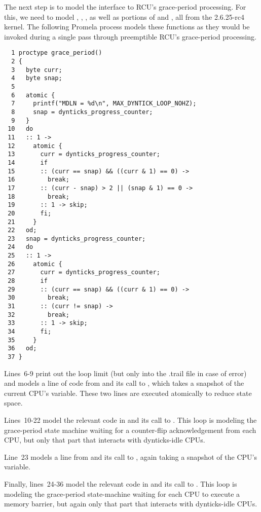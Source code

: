The next step is to model the interface to RCU's grace-period
processing.
For this, we need to model
,
,
,
as well as portions of
 and
, all from the 2.6.25-rc4 kernel.
The following  Promela process models
these functions as they would be invoked during a single pass
through preemptible RCU's grace-period processing.

{ \scriptsize
\begin{verbatim}
  1 proctype grace_period()
  2 {
  3   byte curr;
  4   byte snap;
  5
  6   atomic {
  7     printf("MDLN = %d\n", MAX_DYNTICK_LOOP_NOHZ);
  8     snap = dynticks_progress_counter;
  9   }
 10   do
 11   :: 1 ->
 12     atomic {
 13       curr = dynticks_progress_counter;
 14       if
 15       :: (curr == snap) && ((curr & 1) == 0) ->
 16         break;
 17       :: (curr - snap) > 2 || (snap & 1) == 0 ->
 18         break;
 19       :: 1 -> skip;
 20       fi;
 21     }
 22   od;
 23   snap = dynticks_progress_counter;
 24   do
 25   :: 1 ->
 26     atomic {
 27       curr = dynticks_progress_counter;
 28       if
 29       :: (curr == snap) && ((curr & 1) == 0) ->
 30         break;
 31       :: (curr != snap) ->
 32         break;
 33       :: 1 -> skip;
 34       fi;
 35     }
 36   od;
 37 }
\end{verbatim}
}

Lines~6-9 print out the loop limit (but only into the .trail file
in case of error) and models a line of code
from  and its call to
, which takes a
snapshot of the current CPU's 
variable.
These two lines are executed atomically to reduce state space.

Lines~10-22 model the relevant code in
 and its call to
.
This loop is modeling the grace-period state machine waiting for
a counter-flip acknowledgement from each CPU, but only that part
that interacts with dynticks-idle CPUs.

Line~23 models a line from 
and its call to , again
taking a snapshot of the CPU's 
variable.

Finally, lines~24-36 model the relevant code in
 and its call to
.
This loop is modeling the grace-period state-machine waiting for
each CPU to execute a memory barrier, but again only that part
that interacts with dynticks-idle CPUs.

